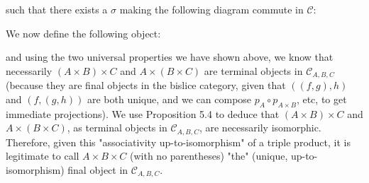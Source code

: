 \documentclass[12pt, letterpaper, twoside]{report}
\begin{document}
such that there exists a $\sigma$ making the following diagram commute in $\mathcal{C}$:


We now define the following object:


and using the two universal properties we have shown above, we know that necessarily $(A \times B) \times C$ and $A \times (B \times C)$ are terminal objects in $\mathcal{C}_{A,B,C}$ (because they are final objects in the bislice category, given that $((f,g),h)$ and $(f,(g,h))$ are both unique, and we can compose $p_A \circ p_{A \times B}$, etc, to get immediate projections). We use Proposition 5.4 to deduce that $(A \times B) \times C$ and $A \times (B \times C)$, as terminal objects in $\mathcal{C}_{A,B,C}$, are necessarily isomorphic. Therefore, given this "associativity up-to-isomorphism" of a triple product, it is legitimate to call $A \times B \times C$ (with no parentheses) "the" (unique, up-to-isomorphism) final object in $\mathcal{C}_{A,B,C}$.
\end{document}

